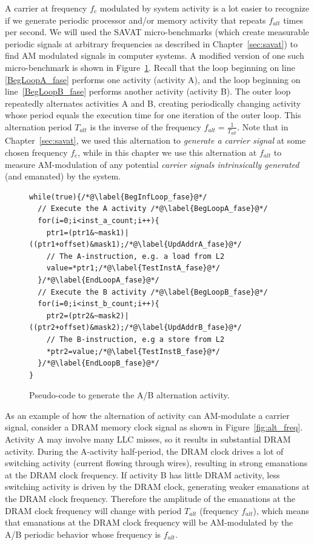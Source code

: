 A carrier at frequency $f_c$ modulated by system activity is a lot easier to recognize if we generate periodic processor and/or memory activity that repeats $f_{alt}$ times per second. We will used the SAVAT micro-benchmarks (which create measurable periodic signals at arbitrary frequencies as described in Chapter~\ref{sec:savat}) to find AM modulated signals in computer systems. A modified version of one such micro-benchmark is shown in Figure~\ref{fase_pseudocode}. Recall that the loop beginning on line \ref{BegLoopA_fase} performs one activity (activity A), and the loop beginning on line~\ref{BegLoopB_fase} performs another activity (activity B). The outer loop repeatedly alternates activities A and B, creating periodically changing activity whose period equals the execution time for one iteration of the outer loop. This alternation period $T_{alt}$ is the inverse of the frequency $f_{alt} = \frac{1}{T_{alt}}$. Note that in Chapter~\ref{sec:savat}, we used this alternation to \emph{generate a carrier signal} at some chosen frequency $f_c$, while in this chapter we use this alternation at $f_{alt}$ to measure AM-modulation of any potential \emph{carrier signals intrinsically generated} (and emanated) by the system.

\begin{figure}[htb]
\lstset{language=C++,basicstyle=\ttfamily\footnotesize,numbers=left}
\begin{lstlisting}[frame=none,xleftmargin=30pt]
while(true){/*@\label{BegInfLoop_fase}@*/
  // Execute the A activity /*@\label{BegLoopA_fase}@*/
  for(i=0;i<inst_a_count;i++){
    ptr1=(ptr1&~mask1)|((ptr1+offset)&mask1);/*@\label{UpdAddrA_fase}@*/
    // The A-instruction, e.g. a load from L2
    value=*ptr1;/*@\label{TestInstA_fase}@*/
  }/*@\label{EndLoopA_fase}@*/
  // Execute the B activity /*@\label{BegLoopB_fase}@*/
  for(i=0;i<inst_b_count;i++){
    ptr2=(ptr2&~mask2)|((ptr2+offset)&mask2);/*@\label{UpdAddrB_fase}@*/
    // The B-instruction, e.g a store from L2
    *ptr2=value;/*@\label{TestInstB_fase}@*/
  }/*@\label{EndLoopB_fase}@*/
}
\end{lstlisting}
\caption{Pseudo-code to generate the A/B alternation activity.}
\label{fase_pseudocode}
\end{figure}


As an example of how the alternation of activity can AM-modulate a carrier signal, consider a DRAM memory clock signal as shown in Figure~\ref{fig:alt_freq}. Activity A may involve many LLC misses, so it results in substantial DRAM activity. During the A-activity half-period, the DRAM clock drives a lot of switching activity (current flowing through wires), resulting in strong emanations at the DRAM clock frequency. If activity B has little DRAM activity, less switching activity is driven by the DRAM clock, generating weaker emanations at the DRAM clock frequency. Therefore the amplitude of the emanations at the DRAM clock frequency will change with period $T_{alt}$ (frequency $f_{alt}$), which means that emanations at the DRAM clock frequency will be AM-modulated by the A/B periodic behavior whose frequency is $f_{alt}$.


